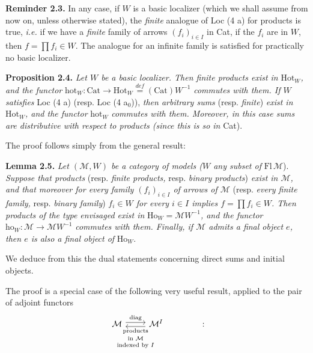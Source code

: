\documentclass[11pt]{article}
\newcommand{\printedpage}[1]{\marginpar{\footnotesize p.~#1}}
\newcommand{\msp}[1]{\marginpar{\footnotesize [#1]}}
\begin{document}
\textbf{Reminder 2.3.} In any case, if $W$ is a basic localizer (which we shall assume from now on, unless otherwise stated), the \textit{finite} analogue of Loc (4 a) for products is true, \textit{i.e.} if we have a \textit{finite} family of arrows $(f_i)_{i\in I}$ in Cat, if the $f_i$ are in $W$, then $f = \prod f_i \in W$. The analogue for an infinite family is satisfied for practically no basic localizer.

\msp{page 10}\textbf{Proposition 2.4.} \textit{Let $W$ be a basic localizer. Then finite products exist in} $\mathrm{Hot}_W$\textit{, and the functor} $\mathrm{hot}_W : \mathrm{Cat} \longrightarrow \mathrm{Hot}_W \overset{\textit{def}}{=} (\mathrm{Cat})W^{-1}$ \textit{commutes with them. If $W$ satisfies} Loc (4 a) (resp. Loc (4 a$_0$)), \textit{then arbitrary sums} (resp. \textit{finite}) \textit{exist in} $\mathrm{Hot}_W$\textit{, and the functor} $\mathrm{hot}_W$ \textit{commutes with them. Moreover, in this case sums are distributive with respect to products (since this is so in} Cat).

The proof follows simply from the general result:

\textbf{Lemma 2.5.} \textit{Let $(\mathcal{M}, W)$ be a category of models ($W$ any subset of} $\mathrm{Fl}\,\mathcal{M}$). \textit{Suppose that products} (resp. \textit{finite products,} resp. \textit{binary products}) \textit{exist in $\mathcal{M}$, and that moreover for every family $(f_i)_{i\in I}$ of arrows of $\mathcal{M}$} (resp. \textit{every finite family,}
\printedpage{6}
resp. \textit{binary family}) \textit{$f_i \in W$ for every $i \in I$ implies $f = \prod f_i \in W$. Then products of the type envisaged exist in} $\mathrm{Ho}_W = \mathcal{M}W^{-1}$\textit{, and the functor} $\mathrm{ho}_W : \mathcal{M} \longrightarrow \mathcal{M}W^{-1}$ \textit{commutes with them. Finally, if $\mathcal{M}$ admits a final object $e$, then $e$ is also a final object of} $\mathrm{Ho}_W$.



\msp{page 11}We deduce from this the dual statements concerning direct sums and initial objects.

The proof is a special case of the following very useful result, applied to the pair of adjoint functors
\[
\begin{tikzcd}
\mathcal{M} \arrow[r, shift left, "\mathrm{diag}"] & \mathcal{M}^I \arrow[l, shift left, "\text{\scriptsize\shortstack{products\\ in $\mathcal{M}$\\ indexed by $I$}}"]
\end{tikzcd}
\qquad\qquad :
\]
\end{document}
